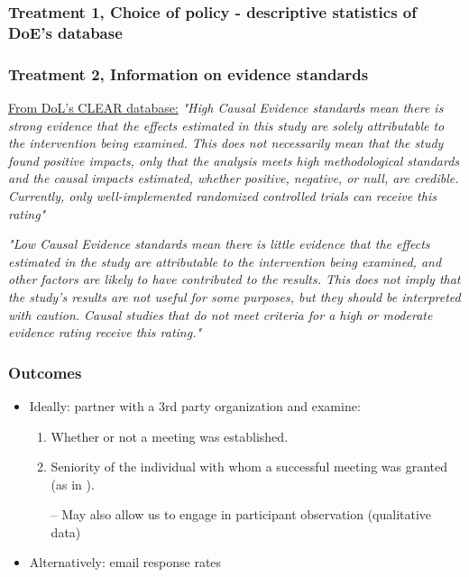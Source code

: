 \documentclass[usenames,dvipsnames]{beamer}
\begin{document}
\begin{frame}
\frametitle{Treatment 1, Choice of policy - descriptive statistics of DoE's database}


\end{frame}



\begin{frame}
\frametitle{Treatment 2, Information on evidence standards}
\scriptsize
\underline{From DoL's CLEAR database:}
\bigbreak
\textit{"\textcolor{Cerulean}{High Causal Evidence standards} mean there is strong evidence that the effects estimated in this study are solely attributable to the intervention being examined. This does not necessarily mean that the study found positive impacts, only that the analysis meets high methodological standards and the causal impacts estimated, whether positive, negative, or null, are credible. Currently, only \textcolor{Cerulean}{well-implemented randomized controlled trials} can receive this rating"}

\textit{"\textcolor{Cerulean}{Low Causal Evidence standards} mean there is little evidence that the effects estimated in the study are attributable to the intervention being examined, and other factors are likely to have contributed to the results. This does not imply that the study's results are not useful for some purposes, but they should be \textcolor{Cerulean}{interpreted with caution}. Causal studies that do not meet criteria for a high or moderate evidence rating receive this rating."}

\end{frame}



\begin{frame}
\frametitle{Outcomes}

\begin{itemize}
\item Ideally: partner with a \textcolor{Cerulean}{3rd party organization} and examine: 
\begin{enumerate} 
\item Whether or not a \textcolor{Cerulean}{meeting was established}. 
\item Seniority of the individual with whom a successful meeting was granted (as in \citet{kalla2016campaign}).
\pause
\item [--] May also allow us to engage in participant observation (qualitative data)
\end{enumerate}
\pause
\vspace{1cm}
\item Alternatively: \textcolor{Cerulean}{email response rates}
\end{itemize}

\end{frame}
\end{document}
